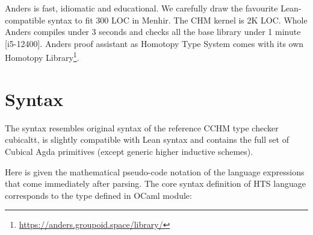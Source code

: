 \documentclass[a4paper,UKenglish,cleveref, autoref, thm-restate]{lipics-v2021}
\begin{document}
Anders is fast, idiomatic and educational. We carefully draw the favourite Lean-compatible
syntax to fit 300 LOC in Menhir. The CHM kernel is 2K LOC. Whole Anders compiles under 3
seconds and checks all the base library under 1 minute [i5-12400]. Anders proof assistant
as Homotopy Type System comes with its own Homotopy Library\footnote{\url{https://anders.groupoid.space/library/}}.

\section{Syntax}

The syntax resembles original syntax of the reference CCHM type checker cubicaltt,
is slightly compatible with Lean syntax and contains the full set of Cubical Agda \cite{CubicalAgda}
primitives (except generic higher inductive schemes).

Here is given the mathematical pseudo-code notation of the language
expressions that come immediately after parsing. The core syntax definition of HTS language
corresponds to the type defined in OCaml module:
\end{document}

